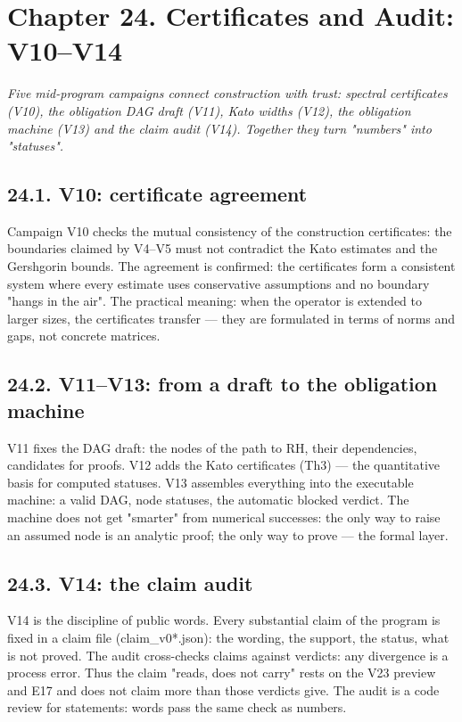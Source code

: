 \documentclass[11pt,a4paper]{article}
\begin{document}
\section{Chapter 24. Certificates and Audit: V10–V14}

\noindent\textit{\color{copper}Five mid-program campaigns connect construction with trust: spectral certificates (V10), the obligation DAG draft (V11), Kato widths (V12), the obligation machine (V13) and the claim audit (V14). Together they turn "numbers" into "statuses".}

\subsection{24.1. V10: certificate agreement}

Campaign V10 checks the mutual consistency of the construction certificates: the boundaries claimed by V4–V5 must not contradict the Kato estimates and the Gershgorin bounds. The agreement is confirmed: the certificates form a consistent system where every estimate uses conservative assumptions and no boundary "hangs in the air". The practical meaning: when the operator is extended to larger sizes, the certificates transfer — they are formulated in terms of norms and gaps, not concrete matrices.

\subsection{24.2. V11–V13: from a draft to the obligation machine}

V11 fixes the DAG draft: the nodes of the path to RH, their dependencies, candidates for proofs. V12 adds the Kato certificates (Th3) — the quantitative basis for computed statuses. V13 assembles everything into the executable machine: a valid DAG, node statuses, the automatic blocked verdict. The machine does not get "smarter" from numerical successes: the only way to raise an assumed node is an analytic proof; the only way to prove — the formal layer.

\subsection{24.3. V14: the claim audit}

V14 is the discipline of public words. Every substantial claim of the program is fixed in a claim file (claim\_v0*.json): the wording, the support, the status, what is not proved. The audit cross-checks claims against verdicts: any divergence is a process error. Thus the claim "reads, does not carry" rests on the V23 preview and E17 and does not claim more than those verdicts give. The audit is a code review for statements: words pass the same check as numbers.
\end{document}
